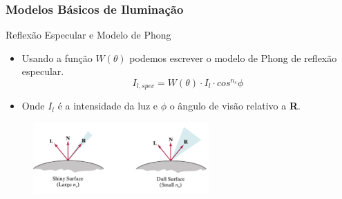 \documentclass{beamer}
\begin{document}
\begin{frame}
\frametitle{Modelos Básicos de Iluminação}

	\begin{block}{Reflexão Especular e Modelo de Phong}
		\begin{itemize}
			\item Usando a função $W(\theta)$ podemos escrever o modelo de Phong 	de reflexão especular.
			\begin{equation*}
				I_{l,spec} = W(\theta) \cdot I_l \cdot cos^{n_s} \phi
			\end{equation*}
			\item Onde $I_l$ é a intensidade da luz e $\phi$ o ângulo de visão relativo a \textbf{R}.
		\end{itemize}
	\end{block}
	
	\begin{figure}[!h]
		\begin{center}
		\includegraphics[width=0.6\textwidth]{Figures/RefEspSup}
		\end{center}
	\end{figure}	
\end{frame}
\end{document}
